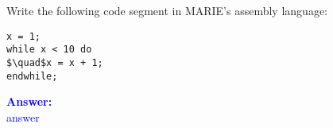 \item{}
Write the following code segment in MARIE’s assembly language:
\begin{lstlisting}
x = 1;
while x < 10 do
$\quad$x = x + 1;
endwhile;
\end{lstlisting}
\vskip12pt
\ifanswers
\textcolor{blue}{
\textbf{Answer:}\\
answer
}
\newpage
\fi


